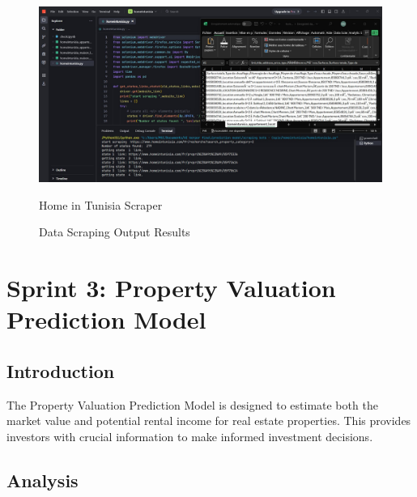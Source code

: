 \begin{figure}[htbp]
    \begin{minipage}{0.45\textwidth}
        \centering
        \includegraphics[width=\linewidth]{images/home_in_tunisia_scraper.jpeg}
        \caption*{Home in Tunisia Scraper}
    \end{minipage}
    \caption{Data Scraping Output Results}
    \label{fig:scraping-output}
\end{figure}

\newpage

\section{Sprint 3: Property Valuation Prediction Model}

\subsection*{Introduction}
The Property Valuation Prediction Model is designed to estimate both the market value and potential rental income for real estate properties. This provides investors with crucial information to make informed investment decisions.

\subsection{Analysis}
